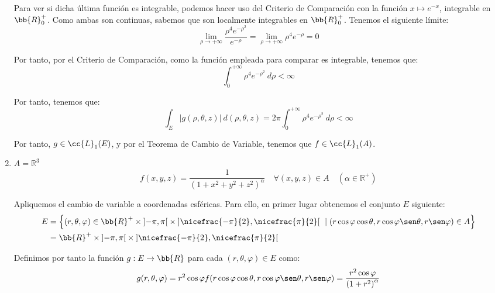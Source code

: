 \begin{ejercicio}
\begin{enumerate}
        Para ver si dicha última función es integrable, podemos hacer uso del Criterio de Comparación con la función $x\mapsto e^{-x}$, integrable en $\bb{R}^+_0$.
        Como ambas son continuas, sabemos que son localmente integrables en $\bb{R}^+_0$. Tenemos el siguiente límite:
        \begin{equation*}
            \lim_{\rho\to+\infty} \frac{\rho^4e^{-\rho^2}}{e^{-\rho}} = \lim_{\rho\to+\infty} \rho^4e^{-\rho} = 0
        \end{equation*}

        Por tanto, por el Criterio de Comparación, como la función empleada para comparar es integrable, tenemos que:
        \begin{equation*}
            \int_0^{+\infty}\rho^4e^{-\rho^2}~d\rho < \infty
        \end{equation*}

        Por tanto, tenemos que:
        \begin{equation*}
            \int_E |g(\rho, \theta, z)|~d(\rho, \theta, z) = 2\pi \int_0^{+\infty}\rho^4e^{-\rho^2}~d\rho < \infty
        \end{equation*}

        Por tanto, $g\in \cc{L}_1(E)$, y por el Teorema de Cambio de Variable, tenemos que $f\in \cc{L}_1(A)$.

        \item \( A = \mathbb{R}^3 \)
        \[ f(x, y, z) = \frac{1}{\left(1 + x^2 + y^2 + z^2\right)^\alpha} \quad \forall (x, y, z) \in A \quad (\alpha \in \mathbb{R}^+) \]

        Apliquemos el cambio de variable a coordenadas esféricas. Para ello, en primer
        lugar obtenemos el conjunto $E$ siguiente:
        \begin{align*}
            E &= \left\{ (r, \theta, \varphi) \in \bb{R}^+\times \left]-\pi, \pi\right[ \times \left] \nicefrac{-\pi}{2},\nicefrac{\pi}{2} \right[ ~\mid (r\cos\varphi\cos\theta, r\cos\varphi\sen\theta, r\sen\varphi) \in A \right\} \\
            &= \bb{R}^+\times \left]-\pi, \pi\right[ \times \left] \nicefrac{-\pi}{2},\nicefrac{\pi}{2} \right[
        \end{align*}

        Definimos por tanto la función $g: E \to \bb{R}$ para cada $(r, \theta, \varphi) \in E$ como:
        \begin{equation*}
            g(r, \theta, \varphi) = r^2\cos\varphi f(r\cos\varphi\cos\theta, r\cos\varphi\sen\theta, r\sen\varphi) =
            \frac{r^2\cos\varphi}{\left(1 + r^2\right)^\alpha}
        \end{equation*}


\end{enumerate}
\end{ejercicio}
